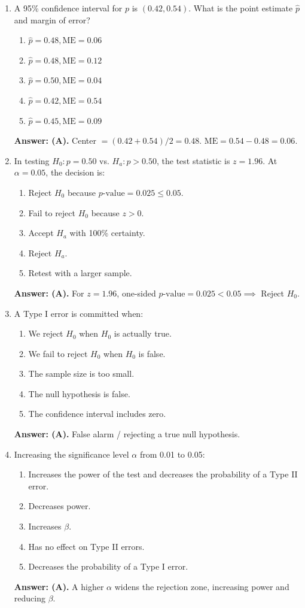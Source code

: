 \begin{enumerate}[leftmargin=1.5em]
  \item A 95\% confidence interval for $p$ is $(0.42, 0.54)$. What is the point estimate $\hat{p}$ and margin of error?
  \begin{enumerate}[label=(\Alph*)]
    \item $\hat{p} = 0.48, \text{ME} = 0.06$ \item $\hat{p} = 0.48, \text{ME} = 0.12$ \item $\hat{p} = 0.50, \text{ME} = 0.04$ \item $\hat{p} = 0.42, \text{ME} = 0.54$ \item $\hat{p} = 0.45, \text{ME} = 0.09$
  \end{enumerate}
  \textbf{Answer: (A).} Center $= (0.42 + 0.54)/2 = 0.48$. $\text{ME} = 0.54 - 0.48 = 0.06$.

  \item In testing $H_0: p = 0.50$ vs. $H_a: p > 0.50$, the test statistic is $z = 1.96$. At $\alpha = 0.05$, the decision is:
  \begin{enumerate}[label=(\Alph*)]
    \item Reject $H_0$ because $p\text{-value} = 0.025 \le 0.05$.
    \item Fail to reject $H_0$ because $z > 0$.
    \item Accept $H_a$ with 100\% certainty.
    \item Reject $H_a$.
    \item Retest with a larger sample.
  \end{enumerate}
  \textbf{Answer: (A).} For $z = 1.96$, one-sided $p\text{-value} = 0.025 < 0.05 \implies$ Reject $H_0$.

  \item A Type I error is committed when:
  \begin{enumerate}[label=(\Alph*)]
    \item We reject $H_0$ when $H_0$ is actually true.
    \item We fail to reject $H_0$ when $H_0$ is false.
    \item The sample size is too small.
    \item The null hypothesis is false.
    \item The confidence interval includes zero.
  \end{enumerate}
  \textbf{Answer: (A).} False alarm / rejecting a true null hypothesis.

  \item Increasing the significance level $\alpha$ from 0.01 to 0.05:
  \begin{enumerate}[label=(\Alph*)]
    \item Increases the power of the test and decreases the probability of a Type II error.
    \item Decreases power.
    \item Increases $\beta$.
    \item Has no effect on Type II errors.
    \item Decreases the probability of a Type I error.
  \end{enumerate}
  \textbf{Answer: (A).} A higher $\alpha$ widens the rejection zone, increasing power and reducing $\beta$.


\end{enumerate}

